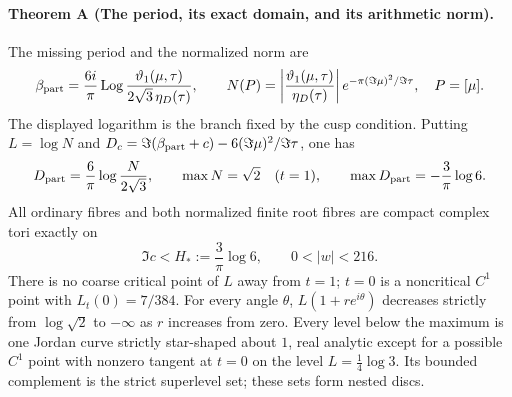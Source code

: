 \documentclass[11pt,a4paper]{article}
\theoremstyle{definition}
\providecommand{\Log}{\operatorname{Log}}
\begin{document}
\paragraph{Theorem A (The period, its exact domain, and its arithmetic norm).}
\label{series:I:A}
The missing period and the normalized norm are
\[
 \beta_{\rm part}=\frac{6i}{\pi}\Log
 \frac{\vartheta_1(\mu,\tau)}{2\sqrt3\,\eta_D(\tau)},
 \qquad
 N(P)=\left|\frac{\vartheta_1(\mu,\tau)}{\eta_D(\tau)}\right|
           e^{-\pi(\Im\mu)^2/\Im\tau},
 \quad P=[\mu].
\]
The displayed logarithm is the branch fixed by the cusp condition.
Putting $L=\log N$ and
$D_c=\Im(\beta_{\rm part}+c)-6(\Im\mu)^2/\Im\tau$, one has
\[
 D_{
 \rm part}=\frac6\pi\log\frac{N}{2\sqrt3},\qquad
 \max N=\sqrt2\quad(t=1),\qquad
 \max D_{\rm part}=-\frac3\pi\log6.
\]
All ordinary fibres and both normalized finite root fibres are
compact complex tori exactly on
\[
 \Im c<H_*:=\frac3\pi\log6,
 \qquad 0<|w|<216.
\]
There is no coarse critical point of $L$ away from $t=1$;
$t=0$ is a noncritical $C^1$ point with $L_t(0)=7/384$.
For every angle $\theta$, $L(1+re^{i\theta})$ decreases strictly
from $\log\sqrt2$ to $-\infty$ as $r$ increases from zero.
Every level below the maximum is one Jordan curve strictly
star-shaped about $1$, real analytic except for a possible
$C^1$ point with nonzero tangent at $t=0$ on the level
$L=\tfrac14\log3$.  Its bounded complement is the strict
superlevel set; these sets form nested discs.
\end{document}
